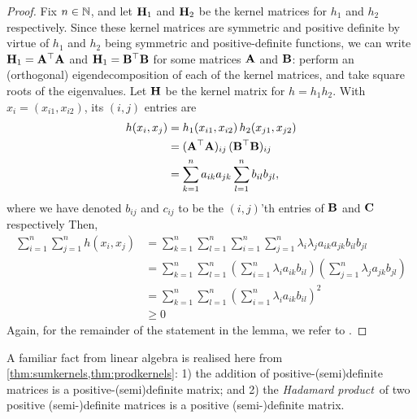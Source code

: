\begin{proof}
  Fix $n\in\mathbb{N}$, and let ${\mathbf H}_1$ and ${\mathbf H}_2$ be the kernel matrices for $h_1$ and $h_2$ respectively.
  Since these kernel matrices are symmetric and positive definite by virtue of $h_1$ and $h_2$ being symmetric and positive-definite functions, we can write ${\mathbf H}_1 = {\mathbf A}^\top{\mathbf A}$ and ${\mathbf H}_1 = {\mathbf B}^\top{\mathbf B}$ for some matrices ${\mathbf A}$ and ${\mathbf B}$: perform an (orthogonal) eigendecomposition of each of the kernel matrices, and take square roots of the eigenvalues.
  Let ${\mathbf H}$ be the kernel matrix for $h = h_1h_2$.
  With $x_i = (x_{i1}, x_{i2})$, its $(i,j)$ entries are
  \begin{align*}
    h(x_i,x_j)
    &= h_1(x_{i1},x_{i2}) \, h_2(x_{j1},x_{j2}) \\
    &= ({\mathbf A}^\top{\mathbf A})_{ij} \, ({\mathbf B}^\top{\mathbf B})_{ij} \\
    &= \sum_{k=1}^n a_{ik}a_{jk} \sum_{l=1}^n b_{il}b_{jl},
  \end{align*}
  where we have denoted $b_{ij}$ and $c_{ij}$ to be the $(i,j)$'th entries of ${\mathbf B}$ and ${\mathbf C}$ respectively 
  Then,
  \begin{align*}
    \sum_{i=1}^n\sum_{j=1}^n h(x_i,x_j)
    &= \sum_{k=1}^n \sum_{l=1}^n \sum_{i=1}^n \sum_{j=1}^n  \lambda_i \lambda_j a_{ik}a_{jk}b_{il}b_{jl} \\
    &= \sum_{k=1}^n \sum_{l=1}^n \left(\sum_{i=1}^n \lambda_i a_{ik} b_{il} \right) \left( \sum_{j=1}^n  \lambda_j a_{jk}b_{jl} \right) \\
    &= \sum_{k=1}^n \sum_{l=1}^n \left(\sum_{i=1}^n \lambda_i a_{ik} b_{il} \right)^2 \\
    &\geq 0
  \end{align*}
  Again, for the remainder of the statement in the lemma, we refer to \citet[Thm. 13]{berlinet2011reproducing}.
\end{proof}

A familiar fact from linear algebra is realised here from \cref{thm:sumkernels,thm:prodkernels}: 
1) the addition of positive-(semi)definite matrices is a positive-(semi)definite matrix; and 
2) the \emph{Hadamard product}\footnotemark~of two positive (semi-)definite matrices is a positive (semi-)definite matrix.


